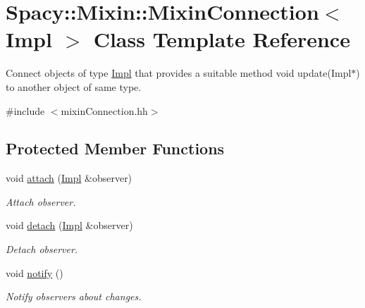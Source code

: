 \hypertarget{classSpacy_1_1Mixin_1_1MixinConnection}{}\section{Spacy\+:\+:Mixin\+:\+:Mixin\+Connection$<$ Impl $>$ Class Template Reference}
\label{classSpacy_1_1Mixin_1_1MixinConnection}


Connect objects of type \hyperlink{classSpacy_1_1Mixin_1_1Impl}{Impl} that provides a suitable method void update(\+Impl$\ast$) to another object of same type.  




{\ttfamily \#include $<$mixin\+Connection.\+hh$>$}

\subsection*{Protected Member Functions}
\begin{DoxyCompactItemize}
\item 
\hypertarget{classSpacy_1_1Mixin_1_1MixinConnection_abb5520ee6b22dd993d78f142939a1ed4}{}void \hyperlink{classSpacy_1_1Mixin_1_1MixinConnection_abb5520ee6b22dd993d78f142939a1ed4}{attach} (\hyperlink{classSpacy_1_1Mixin_1_1Impl}{Impl} \&observer)\label{classSpacy_1_1Mixin_1_1MixinConnection_abb5520ee6b22dd993d78f142939a1ed4}

\begin{DoxyCompactList}\small\item\em Attach observer. \end{DoxyCompactList}\item 
\hypertarget{classSpacy_1_1Mixin_1_1MixinConnection_adda739590c487679c26f60e50aedb73f}{}void \hyperlink{classSpacy_1_1Mixin_1_1MixinConnection_adda739590c487679c26f60e50aedb73f}{detach} (\hyperlink{classSpacy_1_1Mixin_1_1Impl}{Impl} \&observer)\label{classSpacy_1_1Mixin_1_1MixinConnection_adda739590c487679c26f60e50aedb73f}

\begin{DoxyCompactList}\small\item\em Detach observer. \end{DoxyCompactList}\item 
\hypertarget{classSpacy_1_1Mixin_1_1MixinConnection_a1ddeaa78a3bb4a38c2cca36d1f99fe36}{}void \hyperlink{classSpacy_1_1Mixin_1_1MixinConnection_a1ddeaa78a3bb4a38c2cca36d1f99fe36}{notify} ()\label{classSpacy_1_1Mixin_1_1MixinConnection_a1ddeaa78a3bb4a38c2cca36d1f99fe36}

\begin{DoxyCompactList}\small\item\em Notify observers about changes. \end{DoxyCompactList}\end{DoxyCompactItemize}


